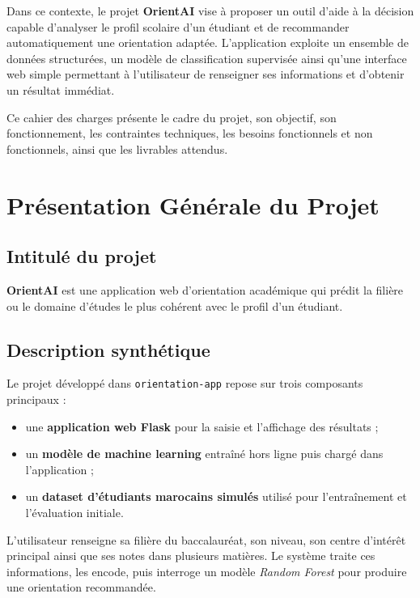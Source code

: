 \documentclass[12pt,a4paper]{report}
\begin{document}
Dans ce contexte, le projet \textbf{OrientAI} vise à proposer un outil d'aide à la décision capable d'analyser le profil scolaire d'un étudiant et de recommander automatiquement une orientation adaptée. L'application exploite un ensemble de données structurées, un modèle de classification supervisée ainsi qu'une interface web simple permettant à l'utilisateur de renseigner ses informations et d'obtenir un résultat immédiat.

Ce cahier des charges présente le cadre du projet, son objectif, son fonctionnement, les contraintes techniques, les besoins fonctionnels et non fonctionnels, ainsi que les livrables attendus.

\chapter{Présentation Générale du Projet}

\section{Intitulé du projet}
\textbf{OrientAI} est une application web d'orientation académique qui prédit la filière ou le domaine d'études le plus cohérent avec le profil d'un étudiant.

\section{Description synthétique}
Le projet développé dans \texttt{orientation-app} repose sur trois composants principaux :
\begin{itemize}[label=--]
    \item une \textbf{application web Flask} pour la saisie et l'affichage des résultats ;
    \item un \textbf{modèle de machine learning} entraîné hors ligne puis chargé dans l'application ;
    \item un \textbf{dataset d'étudiants marocains simulés} utilisé pour l'entraînement et l'évaluation initiale.
\end{itemize}

L'utilisateur renseigne sa filière du baccalauréat, son niveau, son centre d'intérêt principal ainsi que ses notes dans plusieurs matières. Le système traite ces informations, les encode, puis interroge un modèle \textit{Random Forest} pour produire une orientation recommandée.
\end{document}
